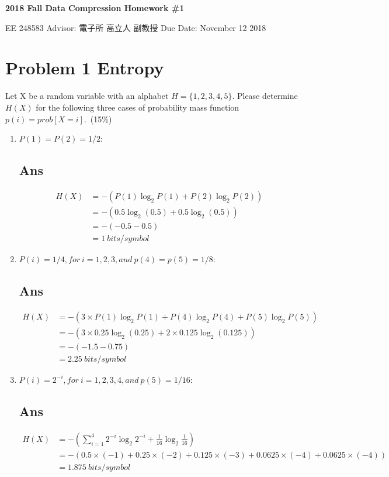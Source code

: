 \documentclass[a4paper, 11pt]{article}
\begin{document}
\noindent
\begin{center}
  \large\textbf{2018 Fall Data Compression Homework \#1} \\
\end{center}
\begin{CJK}{UTF8}{bsmi}
\normalsize EE 248583 
Advisor: 電子所 高立人 副教授
\null\hfill Due Date: November 12 2018 \\
\end{CJK}

\section*{Problem 1 Entropy}
Let X be a random variable with an alphabet $H=\{1, 2, 3, 4, 5\}$. Please determine 
$H(X)$ for the following three cases of probability mass function $p(i)=prob[X=i]$.~(15\%)
\begin{enumerate}[label=(\alph*)]
  \item $P(1)=P(2)=1/2$:
    \subsection*{Ans}
    \begin{align*}
      H(X)&=-(P(1)\log_{2}P(1)+P(2)\log_{2}P(2)) \\
          &=-(0.5\log_{2}(0.5)+0.5\log_{2}(0.5)) \\
          &=-(-0.5-0.5)  \\
          &=1 ~bits/symbol
    \end{align*}
    \label{p:1-a}
  \item $P(i)=1/4, for~i = 1, 2, 3,and~p(4) = p(5) = 1/8$:
    \subsection*{Ans}
    \begin{align*}
      H(X)&=-(3\times P(1)\log_{2}P(1)+P(4)\log_{2}P(4)+P(5)\log_{2}P(5)) \\
          &=-(3\times 0.25\log_{2}(0.25)+2\times 0.125\log_{2}(0.125)) \\
          &=-(-1.5-0.75)  \\
          &=2.25 ~bits/symbol
    \end{align*}
    \label{p:1-b}
  \item $P(i)=2^{-i}, for~i = 1, 2, 3, 4,and~p(5) =  1/16$:
    \subsection*{Ans}
    \begin{align*}
      H(X)&=-(\sum_{i=1}^{4} 2^{-i}\log_{2}2^{-i}+\frac{1}{16}\log_{2}\frac{1}{16}) \\
          &=-(0.5\times(-1)+0.25\times(-2)+0.125\times(-3)+0.0625\times(-4)
            +0.0625\times(-4)) \\
          &=1.875 ~bits/symbol
    \end{align*}
    \label{p:1-c}
\end{enumerate}
\newpage
\end{document}
